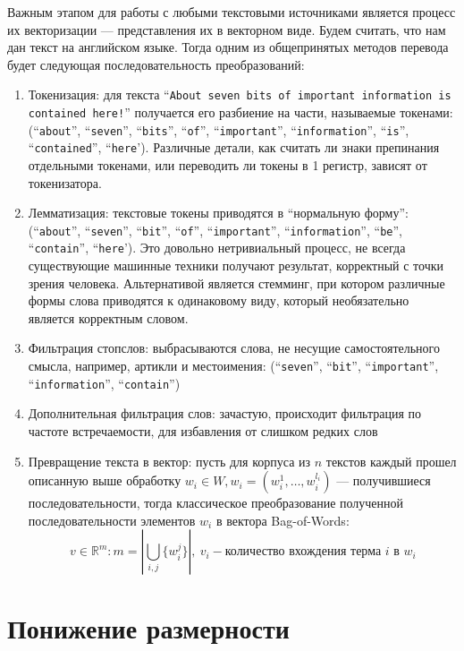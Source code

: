 \documentclass[pdftex,14pt,a4paper]{extreport}
\begin{document}
Важным этапом для работы с любыми текстовыми источниками является процесс их векторизации --- представления их в векторном
виде. Будем считать, что нам дан текст на английском языке. Тогда одним из общепринятых методов перевода будет следующая
последовательность преобразований:
\begin{enumerate}
\item Токенизация\cite{info_retrieval}: для текста ``\texttt{About seven bits of important information is contained here!}'' получается
его разбиение на части, называемые токенами: (``\texttt{about}'', ``\texttt{seven}'', ``\texttt{bits}'', ``\texttt{of}'',
``\texttt{important}'', ``\texttt{information}'', ``\texttt{is}'', ``\texttt{contained}'', ``\texttt{here}'). Различные детали, как считать ли знаки препинания отдельными токенами, или переводить ли токены в 1 регистр, зависят от
токенизатора.
\item Лемматизация\cite{info_retrieval}: текстовые токены приводятся в ``нормальную форму'':
(``\texttt{about}'', ``\texttt{seven}'', ``\texttt{bit}'', ``\texttt{of}'',
``\texttt{important}'', ``\texttt{information}'', ``\texttt{be}'', ``\texttt{contain}'', ``\texttt{here}').
Это довольно нетривиальный процесс, не всегда существующие машинные техники получают результат, корректный с точки
зрения человека. Альтернативой является стемминг, при котором различные формы слова приводятся к одинаковому виду,
который необязательно является корректным словом.
\item Фильтрация стопслов: выбрасываются слова, не несущие самостоятельного смысла, например, артикли и местоимения:
(``\texttt{seven}'', ``\texttt{bit}'', ``\texttt{important}'', ``\texttt{information}'', ``\texttt{contain}'')
\item Дополнительная фильтрация слов: зачастую, происходит фильтрация по частоте встречаемости, для избавления от слишком редких
слов
\item Превращение текста в вектор: пусть для корпуса из $n$ текстов каждый прошел описанную выше обработку $w_i \in W,
w_i=(w_i^1,\ldots,w_i^{l_i})$ --- получившиеся последовательности, тогда классическое преобразование
полученной последовательности элементов $w_i$ в вектора Bag-of-Words\cite{info_retrieval}:
\begin{equation}
v\in\mathbb{R}^m: m=\left|\bigcup_{i,j} \{w^j_i\}\right|,\ v_i - \text{количество вхождения терма } i\text{ в } w_i
\end{equation}
\end{enumerate}

\section{Понижение размерности}
\end{document}
